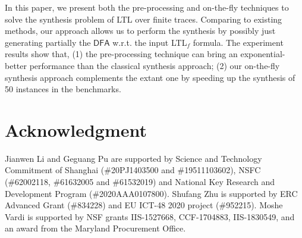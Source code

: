 \documentclass[letterpaper]{article} %
\newcommand{\ltlf}{\textsf{LTL}$_f$\xspace}
\newcommand{\ltl}{\textsf{LTL}\xspace}
\def\dfa{$\mathsf{DFA}$\xspace}
\begin{document}
In this paper, we present both the pre-processing and on-the-fly techniques to solve the synthesis problem of \ltl over finite traces. Comparing to existing methods, our approach allows us to perform the synthesis by possibly just generating partially the \dfa w.r.t. the input \ltlf formula. The experiment results show that, (1) the pre-processing technique can bring an exponential-better performance than the classical synthesis approach; (2) our on-the-fly synthesis approach complements the extant one by speeding up the synthesis of 50 instances in the benchmarks.  




\section{Acknowledgment}
Jianwen Li and Geguang Pu are supported by  Science and Technology Commitment of Shanghai (\#20PJ1403500 and \#19511103602), NSFC (\#62002118, \#61632005 and \#61532019) and National Key Research and Development Program (\#2020AAA0107800). Shufang Zhu is supported by ERC Advanced Grant (\#834228) and EU ICT-48 2020 project (\#952215). Moshe Vardi is supported by NSF grants IIS-1527668, CCF-1704883,
IIS-1830549, and an award from the Maryland Procurement Office.

%


%
\end{document}

